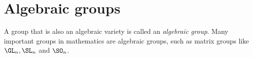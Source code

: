 \newpage
\section{Algebraic groups}
A group that is also an algebraic variety is called an \emph{algebraic group}.
Many important groups in mathematics are algebraic groups, such as matrix groups like $\GL_n, \SL_n$ and $\SO_n$.







